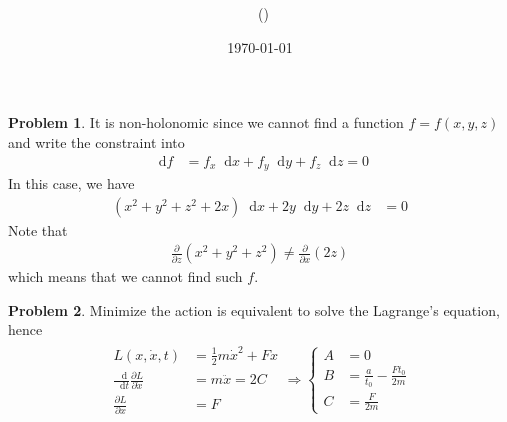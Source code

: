 \documentclass[twoside,11pt]{article}
\title{{\lms \Code \ \Ass}}
\author{\lms \name \ (\href{mailto:\mail}{\mail})}
\date{\sffamily \today}
\makeatletter
\newcommand{\lms}{\fontfamily{lmss}\selectfont} %
\renewcommand*\d{\mathop{}\!\mathrm{d}}
\theoremstyle{definition}
\newtheorem{problem}{\lms Problem}
\theoremstyle{remark}
\newtheorem*{remark}{\lms Remark}
\renewcommand{\maketitle}{\bgroup\setlength{\parindent}{0pt}
\begin{flushleft}
  \textbf{\Large\@title}

  \@author
\end{flushleft}\egroup
}
\makeatother
\begin{document}
\maketitle
\thispagestyle{title}


\begin{problem}
It is non-holonomic since we cannot find a function
$f=f(x,y,z)$ and write the constraint into
\begin{align*}
    \d f &= f_x\d x + f_y\d y + f_z\d z = 0
\end{align*}
In this case, we have
\begin{align*}
    (x^2+y^2+z^2+2x)\d x + 
    2y\d y + 
    2z\d z &= 0
\end{align*}
Note that
\begin{align*}
    \frac{\partial}{\partial z}(x^2+y^2+z^2)\neq
    \frac{\partial}{\partial x}(2z)
\end{align*}
which means that we cannot find such $f$.
\end{problem}


\begin{problem}
Minimize the action is equivalent to solve the Lagrange's equation, 
hence
\begin{align*}
    \begin{aligned}
    L(x, \dot{x}, t) &= \frac{1}{2}m\dot{x}^2 + Fx\\
    \frac{\d}{\d t}\frac{\partial L}{\partial \dot{x}} &= 
    m\ddot{x} = 2C\\
    \frac{\partial L}{\partial x} &= F
    \end{aligned}
    \Rightarrow
    \left\{
    \begin{aligned}
        A &= 0\\
        B &= \frac{a}{t_0} - \frac{Ft_0}{2m}\\
        C &= \frac{F}{2m}
    \end{aligned}
    \right.
\end{align*}
\end{problem}
\end{document}

